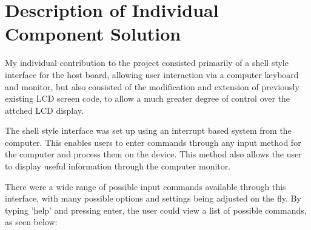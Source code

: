 \section{Description of Individual Component Solution}

My individual contribution to the project consisted primarily of a shell style 
interface for the host board, allowing user interaction via a computer keyboard 
and monitor, but also consisted of the modification and extension of previously 
existing LCD screen code, to allow a much greater degree of control over the 
attched LCD display. 

The shell style interface was set up using an interrupt based system from the 
computer. This enables users to enter commands through any input method for 
the computer and process them on the device. This method also allows the user
to display useful information through the computer monitor.

There were a wide range of possible input commands available through this 
interface, with many possible options and settings being adjusted on the fly. 
By typing 'help' and pressing enter, the user could view a list of possible 
commands, as seen below: 

